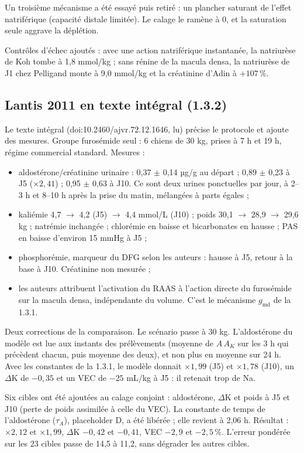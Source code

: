 \documentclass[10pt,a4paper]{article}
\begin{document}
Un troisième mécanisme a été essayé puis retiré : un plancher saturant de l'effet natriférique (capacité distale limitée). Le calage le ramène à 0, et la saturation seule aggrave la déplétion.

Contrôles d'échec ajoutés : avec une action natriférique instantanée, la natriurèse de Koh tombe à 1,8 mmol/kg ; sans rénine de la macula densa, la natriurèse de J1 chez Pelligand monte à 9,0 mmol/kg et la créatinine d'Adin à $+107$\,\%.

\subsection{Lantis 2011 en texte intégral (1.3.2)}
Le texte intégral (doi:10.2460/ajvr.72.12.1646, lu) précise le protocole et ajoute des mesures. Groupe furosémide seul : 6 chiens de 30 kg, prises à 7 h et 19 h, régime commercial standard. Mesures :
\begin{itemize}
\item aldostérone/créatinine urinaire : 0,37 $\pm$ 0,14 µg/g au départ ; 0,89 $\pm$ 0,23 à J5 ($\times 2{,}41$) ; 0,95 $\pm$ 0,63 à J10. Ce sont deux urines ponctuelles par jour, à 2–3 h et 8–10 h après la prise du matin, mélangées à parts égales ;
\item kaliémie 4,7 $\to$ 4,2 (J5) $\to$ 4,4 mmol/L (J10) ; poids 30,1 $\to$ 28,9 $\to$ 29,6 kg ; natrémie inchangée ; chlorémie en baisse et bicarbonates en hausse ; PAS en baisse d'environ 15 mmHg à J5 ;
\item phosphorémie, marqueur du DFG selon les auteurs : hausse à J5, retour à la base à J10. Créatinine non mesurée ;
\item les auteurs attribuent l'activation du RAAS à l'action directe du furosémide sur la macula densa, indépendante du volume. C'est le mécanisme $g_\mathrm{md}$ de la 1.3.1.
\end{itemize}
Deux corrections de la comparaison. Le scénario passe à 30 kg. L'aldostérone du modèle est lue aux instants des prélèvements (moyenne de $A\,A_K$ sur les 3 h qui précèdent chacun, puis moyenne des deux), et non plus en moyenne sur 24 h. Avec les constantes de la 1.3.1, le modèle donnait $\times 1{,}99$ (J5) et $\times 1{,}78$ (J10), un $\Delta$K de $-0{,}35$ et un VEC de $-25$ mL/kg à J5 : il retenait trop de Na.

Six cibles ont été ajoutées au calage conjoint : aldostérone, $\Delta$K et poids à J5 et J10 (perte de poids assimilée à celle du VEC). La constante de temps de l'aldostérone ($\tau_A$), placeholder D, a été libérée ; elle revient à 2,06 h. Résultat : $\times 2{,}12$ et $\times 1{,}99$, $\Delta$K $-0{,}42$ et $-0{,}41$, VEC $-2{,}9$ et $-2{,}5$\,\%. L'erreur pondérée sur les 23 cibles passe de 14,5 à 11,2, sans dégrader les autres cibles.
\end{document}
